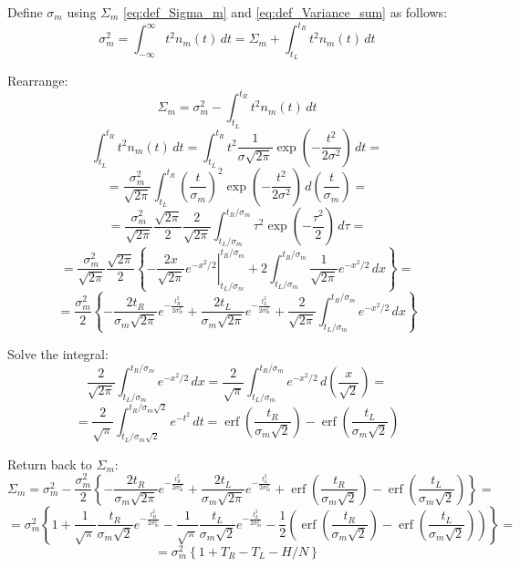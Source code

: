 \documentclass[12pt]{article}
\begin{document}
Define \( \sigma_m \) using \(\Sigma_m\) \eqref{eq:def_Sigma_m} and \eqref{eq:def_Variance_sum} as follows:
\[
\sigma_m^2 = \int_{-\infty}^{\infty} t^2 n_m(t) \,dt =
\Sigma_m + \int_{t_L}^{t_R} t^2 n_m(t) \,dt
\]

Rearrange:
\[
\Sigma_m = \sigma_m^2 - \int_{t_L}^{t_R} t^2 n_m(t) \,dt
\]
\[
\int_{t_L}^{t_R} t^2 n_m(t) \,dt =
\int_{t_L}^{t_R} t^2 \frac{1}{\sigma\sqrt{2 \pi }} \exp\left(-\frac{t^2}{2\sigma^2} \right) \,dt =
\]
\[
    = \frac{\sigma_m^2}{\sqrt{2\pi}}
    \int_{t_L}^{t_R}
    \left(\frac{t}{\sigma_m}\right)^2
    \exp\left(-\frac{t^2}{2\sigma^2} \right)
    \,d\left(\frac{t}{\sigma_m}\right) =
\]
\[
    = \frac{\sigma_m^2}{\sqrt{2\pi}}
    \frac{\sqrt{2\pi}}{2}
    \frac{2}{\sqrt{2\pi}}
    \int_{t_L/\sigma_m}^{t_R/\sigma_m}
    \tau^2
    \exp\left(-\frac{\tau^2}{2} \right)
    \,d\tau =
\]
\[
    = \frac{\sigma_m^2}{\sqrt{2\pi}}
    \frac{\sqrt{2\pi}}{2}
    \left\{
        \left.
        -\frac{2x}{\sqrt{2\pi}} e^{-x^2/2}
        \right|_{t_L/\sigma_m}^{t_R/\sigma_m} +
        2 \int_{t_L/\sigma_m}^{t_R/\sigma_m}
        \frac{1}{\sqrt{2\pi}} e^{-x^2/2} \,dx
    \right\} =
\]
\[
    = \frac{\sigma_m^2}{2}
    \left\{
        -\frac{2t_R}{\sigma_m\sqrt{2\pi}} e^{-\frac{t_R^2}{2\sigma_m^2}} +
        \frac{2t_L}{\sigma_m\sqrt{2\pi}} e^{-\frac{t_L^2}{2\sigma_m^2}} +
        \frac{2}{\sqrt{2\pi}} \int_{t_L/\sigma_m}^{t_R/\sigma_m}
        e^{-x^2/2} \,dx
    \right\}
\]

Solve the integral:
\[
    \frac{2}{\sqrt{2\pi}} \int_{t_L/\sigma_m}^{t_R/\sigma_m}
    e^{-x^2/2} \,dx =
    \frac{2}{\sqrt{\pi}} \int_{t_L/\sigma_m}^{t_R/\sigma_m}
    e^{-x^2/2} \,d\left(\frac{x}{\sqrt{2}}\right) =
\]
\[
    = \frac{2}{\sqrt{\pi}} \int_{t_L/\sigma_m\sqrt{2}}^{t_R/\sigma_m\sqrt{2}}
    e^{-t^2} \,dt =
    \operatorname{erf} \left(\frac{t_R}{\sigma_m\sqrt{2}}\right) -
    \operatorname{erf} \left(\frac{t_L}{\sigma_m\sqrt{2}}\right)
\]

Return back to \(\Sigma_m\):
\[
\Sigma_m = \sigma_m^2 -
\frac{\sigma_m^2}{2}
\left\{
    -\frac{2t_R}{\sigma_m\sqrt{2\pi}} e^{-\frac{t_R^2}{2\sigma_m^2}} +
    \frac{2t_L}{\sigma_m\sqrt{2\pi}} e^{-\frac{t_L^2}{2\sigma_m^2}} +
    \operatorname{erf} \left(\frac{t_R}{\sigma_m\sqrt{2}}\right) -
    \operatorname{erf} \left(\frac{t_L}{\sigma_m\sqrt{2}}\right)
\right\} =
\]
\[
= \sigma_m^2
\left\{
    1 +
    \frac{1}{\sqrt{\pi}} \frac{t_R}{\sigma_m\sqrt{2}} e^{-\frac{t_R^2}{2\sigma_m^2}} -
    \frac{1}{\sqrt{\pi}} \frac{t_L}{\sigma_m\sqrt{2}} e^{-\frac{t_L^2}{2\sigma_m^2}} -
    \frac{1}{2} \left(
        \operatorname{erf} \left(\frac{t_R}{\sigma_m\sqrt{2}}\right) -
        \operatorname{erf} \left(\frac{t_L}{\sigma_m\sqrt{2}}\right)
    \right)
\right\} =
\]
\[
= \sigma_m^2
\left\{
    1 +
    T_R -
    T_L -
    H / N
\right\}
\]
\end{document}
